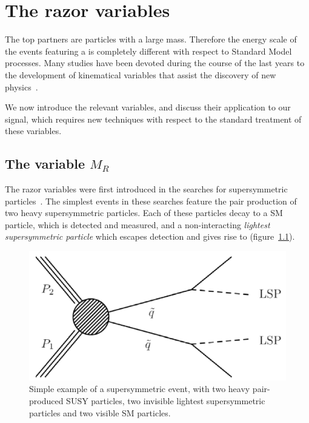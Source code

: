 \chapter{The razor variables}
The top partners are particles with a large mass. Therefore the energy scale
of the events featuring a \TP is completely different with respect to
Standard Model processes. Many studies have been devoted during the course
of the last years to the development of kinematical variables that assist
the discovery of new physics~\cite{rogan_variables}.

We now introduce the relevant variables, and discuss their application to
our signal, which requires new techniques with respect to the standard
treatment of these variables.

\section{The variable $M_R$}
The razor variables were first introduced in the searches for supersymmetric
particles~\cite{supersimmetry_razor}. The simplest events in these searches
feature the pair production of two heavy supersymmetric particles. Each of
these particles decay to a SM particle, which is detected and measured, and
a non-interacting \emph{lightest supersymmetric particle} which escapes
detection and gives rise to \met (figure~\ref{fig:standard_razor_susy}).

\begin{figure}[htb]
    \centering
    \includegraphics[width=.7/textwidth]{images/pdf/standard_razor_susy}

    \caption{Simple example of a supersymmetric event, with two heavy
    pair-produced SUSY particles, two invisible lightest supersymmetric
particles and two visible SM particles.}
    \label{fig:standard_razor_susy}
\end{figure}


